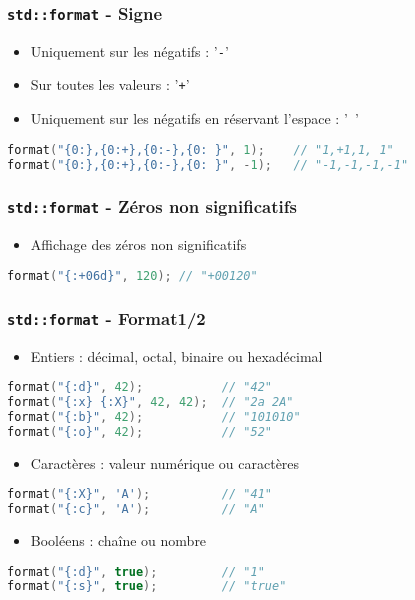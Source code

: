 \documentclass[C++.tex]{subfiles}
\begin{document}
\begin{frame}[fragile]
	\frametitle{\lstinline|std::format| - Signe}
	\begin{itemize}
		\item Uniquement sur les négatifs : '\lstinline|-|'


		\item Sur toutes les valeurs : '\lstinline|+|'
		\item Uniquement sur les négatifs en réservant l'espace : '\lstinline| |'
	\end{itemize}

	\begin{lstlisting}[language=C++]
format("{0:},{0:+},{0:-},{0: }", 1); 	// "1,+1,1, 1"
format("{0:},{0:+},{0:-},{0: }", -1);	// "-1,-1,-1,-1"\end{lstlisting}
\end{frame}

\begin{frame}[fragile]
	\frametitle{\lstinline|std::format| - Zéros non significatifs}
	\begin{itemize}
		\item Affichage des zéros non significatifs
	\end{itemize}

	\begin{lstlisting}[language=C++]
format("{:+06d}", 120);	// "+00120"\end{lstlisting}
\end{frame}

\begin{frame}[fragile]
	\frametitle{\lstinline|std::format| - Format\titlehfill{}1/2}
	\begin{itemize}
		\item Entiers : décimal, octal, binaire ou hexadécimal
	\end{itemize}

	\begin{lstlisting}[language=C++]
format("{:d}", 42);           // "42"
format("{:x} {:X}", 42, 42);  // "2a 2A"
format("{:b}", 42);           // "101010"
format("{:o}", 42);           // "52"\end{lstlisting}

	\begin{itemize}
		\item Caractères : valeur numérique ou caractères
	\end{itemize}

	\begin{lstlisting}[language=C++]
format("{:X}", 'A');          // "41"
format("{:c}", 'A');          // "A"\end{lstlisting}

	\begin{itemize}
		\item Booléens : chaîne ou nombre
	\end{itemize}

	\begin{lstlisting}[language=C++]
format("{:d}", true);         // "1"
format("{:s}", true);         // "true"\end{lstlisting}
\end{frame}
\end{document}
